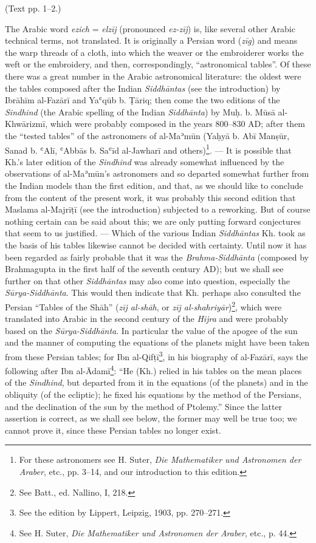 \documentclass[11pt]{article}
\newcommand{\Pg}[1]{\marginpar{\footnotesize\color{gray}#1}}
\begin{document}
\par\begin{center}(Text pp. 1–2.)\end{center}
\par \Pg{33}The Arabic word \emph{ezich} = \emph{elzīj} (pronounced \emph{ez-zīj}) is, like several other Arabic technical terms, not translated. It is originally a Persian word (\emph{zīg}) and means the warp threads of a cloth, into which the weaver or the embroiderer works the weft or the embroidery, and then, correspondingly, “astronomical tables”. Of these there was a great number in the Arabic astronomical literature: the oldest were the tables composed after the Indian \emph{Siddhāntas} (see the introduction) by Ibrāhīm al-Fazārī and Yaʿqūb b. Ṭāriq; then come the two editions of the \emph{Sindhind} (the Arabic spelling of the Indian \emph{Siddhānta}) by Muḥ. b. Mūsā al-Khwārizmī, which were probably composed in the years 800–830 AD; after them the “tested tables” of the astronomers of al-Maʾmūn (Yaḥyā b. Abī Manṣūr, Sanad b. ʿAlī, ʿAbbās b. Saʿīd al-Jawharī and others)\footnote{For these astronomers see H. Suter, \emph{Die Mathematiker und Astronomen der Araber}, etc., pp. 3–14, and our introduction to this edition.}. — It is possible that Kh.'s later edition of the \emph{Sindhind} was already somewhat influenced by the observations of al-Maʾmūn's astronomers and so departed somewhat further from the Indian models than the first edition, and that, as we should like to conclude from the content of the present work, it was probably this second edition that Maslama al-Majrīṭī (see the introduction) subjected to a reworking. But of course nothing certain can be said about this; we are only putting forward conjectures that seem to us justified. — Which of the various Indian \emph{Siddhāntas} Kh. took as the basis of his tables likewise cannot be decided with certainty. Until now it has been regarded as fairly probable that it was the \emph{Brahma-Siddhānta} (composed by Brahmagupta in the first half of the seventh century AD); but we shall see further on that other \emph{Siddhāntas} may also come into question, especially the \emph{Sūrya-Siddhānta}. This would then indicate that Kh. perhaps also consulted the Persian “Tables of the Shāh” (\emph{zīj al-shāh}, or \emph{zīj al-shahriyār})\footnote{See Batt., ed. Nallino, I, 218.}, which were translated into Arabic in the second century of the \emph{Hijra} and were probably based on the \emph{Sūrya-Siddhānta}. In particular the value of the apogee of the sun and the manner of computing the equations of the planets might have been taken from these Persian tables; for Ibn al-Qifṭī\footnote{See the edition by Lippert, Leipzig, 1903, pp. 270–271.}, in his biography of al-Fazārī, says the following after Ibn al-Ādamī\footnote{See H. Suter, \emph{Die Mathematiker und Astronomen der Araber}, etc., p. 44.}: “He (Kh.) relied in his tables on the mean places of the \emph{Sindhind}, but departed from it in the equations (of the planets) and in the obliquity (of the ecliptic); he fixed his equations by the method of the Persians, and the declination of the sun by the method of Ptolemy.” Since the latter assertion is correct, as we shall see below, the former may well be true too; we cannot prove it, since these Persian tables no longer exist.\par
\end{document}

